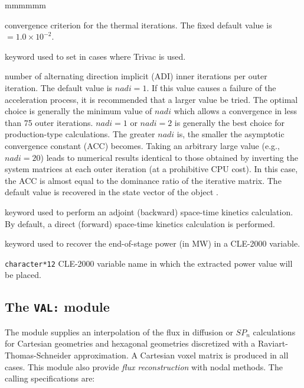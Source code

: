 \begin{ListeDeDescription}{mmmmmm}
\item[\dusa{epsthr}] convergence criterion for the thermal iterations. The
fixed default value is  $=1.0\times 10^{-2}$.

\item[\moc{ADI}] keyword used to set  in cases where Trivac is used.

\item[\dusa{nadi}] number of alternating direction implicit  (ADI) inner
iterations per outer iteration. The default value is $nadi=1$. If this value causes a failure of the acceleration process, it is recommended that a larger value be tried. The optimal
choice is generally the minimum value of $nadi$ which allows a convergence in
less than 75 outer iterations. $nadi=1$ or $nadi=2$ is generally the best
choice for production-type calculations. The greater $nadi$ is, the smaller 
the asymptotic convergence constant (ACC) becomes. Taking an arbitrary large
value (e.g., $nadi=20$) leads to numerical results identical to those obtained by
inverting the system matrices at each
outer iteration (at a prohibitive CPU cost). In this case, the ACC is almost
equal to the dominance ratio of the iterative matrix. The default value is
recovered in the state vector of the  object .

\item[\moc{ADJ}] keyword used to perform an adjoint (backward) space-time kinetics calculation. By default, a direct (forward) space-time kinetics calculation
is performed.

\item[\moc{PICK}]  keyword used to recover the end-of-stage power (in MW) in a CLE-2000 variable.

\item[\dusa{power\_out}] \texttt{character*12} CLE-2000 variable name in which the extracted power value will be placed.

\end{ListeDeDescription}
\clearpage


\subsection{The {\tt VAL:} module}\label{sect:VALData}

The  module supplies an interpolation of the flux in diffusion or $SP_n$ calculations for Cartesian geometries and hexagonal geometries discretized
with a Raviart-Thomas-Schneider approximation. A Cartesian voxel matrix is produced in all cases. This module also provide {\sl flux reconstruction} with nodal
methods. The calling specifications are:

